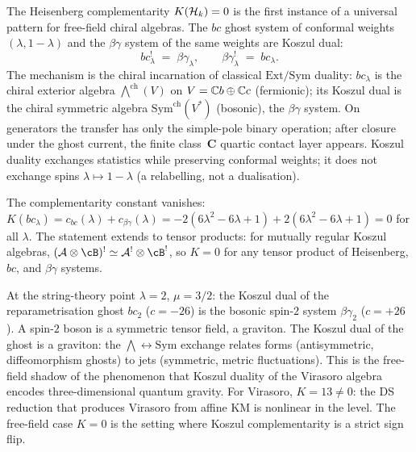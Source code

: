 \begin{remark}
\label{rem:rosetta-bc-betagamma-koszul}
%
%
The Heisenberg complementarity $K(\mathcal{H}_k) = 0$ is the first instance of a universal pattern for free-field chiral algebras. The $bc$ ghost system of conformal weights $(\lambda, 1-\lambda)$ and the $\beta\gamma$ system of the same weights are Koszul dual:
\[
bc_\lambda^! \;=\; \beta\gamma_\lambda,
\qquad
\beta\gamma_\lambda^! \;=\; bc_\lambda.
\]
The mechanism is the chiral incarnation of classical $\mathrm{Ext}/\mathrm{Sym}$ duality: $bc_\lambda$ is the chiral exterior algebra $\bigwedge^{\mathrm{ch}}(V)$ on $V = \mathbb{C} b \oplus \mathbb{C} c$ (fermionic); its Koszul dual is the chiral symmetric algebra $\mathrm{Sym}^{\mathrm{ch}}(V^*)$ (bosonic), the $\beta\gamma$ system. On generators the transfer has only the simple-pole binary operation; after closure under the ghost current, the finite class~$\mathbf C$ quartic contact layer appears. Koszul duality exchanges statistics while preserving conformal weights; it does not exchange spins $\lambda \mapsto 1 - \lambda$ (a relabelling, not a dualisation).

The complementarity constant vanishes: $K(bc_\lambda) = c_{bc}(\lambda) + c_{\beta\gamma}(\lambda) = -2(6\lambda^2 - 6\lambda + 1) + 2(6\lambda^2 - 6\lambda + 1) = 0$ for all $\lambda$. The statement extends to tensor products: for mutually regular Koszul algebras, $(\cA \otimes \cB)^! \simeq \cA^! \otimes \cB^!$, so $K = 0$ for any tensor product of Heisenberg, $bc$, and $\beta\gamma$ systems.

At the string-theory point $\lambda = 2$, $\mu = 3/2$: the Koszul dual of the reparametrisation ghost $bc_2$ ($c = -26$) is the bosonic spin-$2$ system $\beta\gamma_2$ ($c = +26$). A spin-$2$ boson is a symmetric tensor field, a graviton. The Koszul dual of the ghost is a graviton: the $\bigwedge \leftrightarrow \mathrm{Sym}$ exchange relates forms (antisymmetric, diffeomorphism ghosts) to jets (symmetric, metric fluctuations). This is the free-field shadow of the phenomenon that Koszul duality of the Virasoro algebra encodes three-dimensional quantum gravity. For Virasoro, $K = 13 \neq 0$: the DS reduction that produces Virasoro from affine KM is nonlinear in the level. The free-field case $K = 0$ is the setting where Koszul complementarity is a strict sign flip.
\end{remark}

